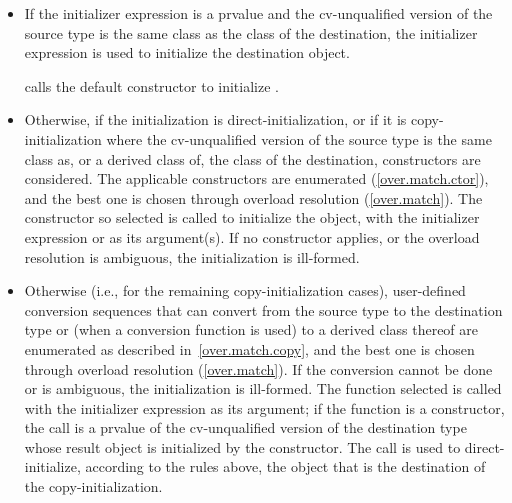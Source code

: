 \begin{itemize}
\begin{itemize}
\item
If the initializer expression is a prvalue
and the cv-unqualified version of the source type
is the same class as the class of the destination,
the initializer expression is used to initialize the destination object.
\begin{example}
 calls the  default constructor to initialize .
\end{example}
\item
Otherwise, if the initialization is direct-initialization,
or if it is copy-initialization where the cv-unqualified version of the source
type is the same class as, or a derived class of, the class of the destination,
constructors are considered.
The applicable constructors
are enumerated (\ref{over.match.ctor}), and the best one is chosen
through overload resolution (\ref{over.match}).
The constructor so selected
is called to initialize the object, with the initializer
expression or  as its argument(s).
If no constructor applies, or the overload resolution is
ambiguous, the initialization is ill-formed.
\item
Otherwise (i.e., for the remaining copy-initialization cases),
user-defined conversion sequences that can convert from the
source type to the destination type or (when a conversion function
is used) to a derived class thereof are enumerated as described in~\ref{over.match.copy}, and the best one is chosen through overload
resolution (\ref{over.match}).  If the conversion cannot be done or
is ambiguous, the initialization is ill-formed.  The function
selected is called with the initializer expression as its
argument; if the function is a constructor, the call is a prvalue
of the cv-unqualified version of the
destination type whose result object is initialized by the constructor.
The call is used
to direct-initialize, according to the rules above, the object
that is the destination of the copy-initialization.
\end{itemize}


\end{itemize}
